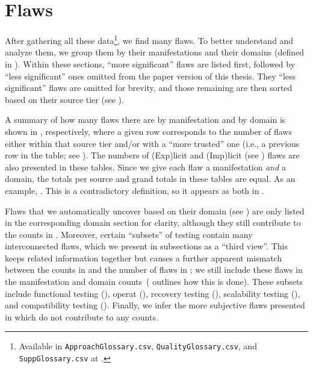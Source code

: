\section{Flaws}
\label{flaws}


After gathering all these data\footnote{Available in \texttt{ApproachGlossary.csv},
    \texttt{QualityGlossary.csv}, and \texttt{SuppGlossary.csv} at .}, we find many
flaws. To better understand and analyze them, we group them by their
manifestations and their domains (defined in ).
Within these sections, \ifnotpaper
    ``more significant'' flaws are
    listed first, followed by ``less significant'' ones omitted from the paper
    version of this thesis. They \else ``less significant'' flaws are
    omitted for brevity, and those remaining \fi are then sorted based on their
source tier (see ).

A summary of how many flaws there are by manifestation and by domain is
shown in , respectively, where a given
row corresponds to the number of flaws either within that source tier and/or
with a ``more trusted'' one (i.e., a previous row in the table; see
). The numbers of (Exp)licit and (Imp)licit
(see ) flaws are also presented in these tables. Since
we give each flaw a manifestation \emph{and} a domain, the totals per
source and grand totals in these tables are equal. As an example, \tourFlaw*{}.
This is a contradictory definition, so it appears \ifnotpaper as both \else in
\fi {}.

Flaws that we automatically uncover based on their domain \ifnotpaper
    (see ) \fi are only listed in the corresponding
domain section for clarity, although they still contribute to the counts in
. Moreover, certain ``subsets'' of testing contain many
interconnected flaws, which we present in subsections as a ``third view''. This
keeps related information together but causes a further apparent mismatch
between the counts in  and the number of
flaws in ; we still include these flaws in the
manifestation and domain counts\ifnotpaper\ ( outlines
    how this is done)\fi. These subsets include functional testing
(), \ifnotpaper \acf{operat} (), \fi
recovery testing (), scalability testing (),
and compatibility testing (). \ifnotpaper Finally, we infer
    the more subjective flaws presented in  which do not
    contribute to any counts.

